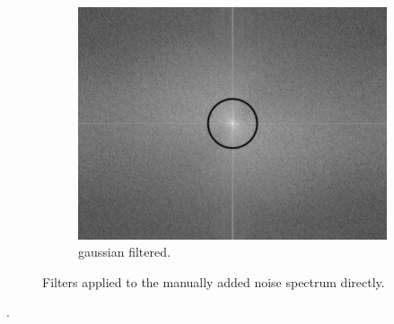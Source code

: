 \documentclass[14pt]{article}
\begin{document}
\begin{figure}[hbt!]
\begin{subfigure}[b]{0.3\linewidth}
				\includegraphics[width=\linewidth]{gaussian_filtered_spec_man.png}
				\caption{gaussian filtered.}
			\end{subfigure}
			\caption{Filters applied to the manually added noise spectrum directly.}
			\label{fig:direct}
		\end{figure}
		.~
\end{document}
